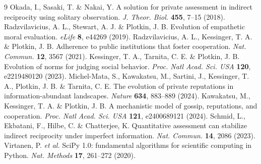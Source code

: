 \documentclass[fleqn,10pt]{article}
\theoremstyle{plain}
\theoremstyle{remark}
\begin{document}
\begin{thebibliography}{9}
Okada, I., Sasaki, T. \& Nakai, Y.
A solution for private assessment in indirect reciprocity using solitary observation.
\textit{J. Theor. Biol.} \textbf{455}, 7--15 (2018).
Radzvilavicius, A. L., Stewart, A. J. \& Plotkin, J. B.
Evolution of empathetic moral evaluation.
\textit{eLife} \textbf{8}, e44269 (2019).
Radzvilavicius, A. L., Kessinger, T. A. \& Plotkin, J. B.
Adherence to public institutions that foster cooperation.
\textit{Nat. Commun.} \textbf{12}, 3567 (2021).
Kessinger, T. A., Tarnita, C. E. \& Plotkin, J. B.
Evolution of norms for judging social behavior.
\textit{Proc. Natl Acad. Sci. USA} \textbf{120}, e2219480120 (2023).
Michel-Mata, S., Kawakatsu, M., Sartini, J., Kessinger, T. A., Plotkin, J. B. \& Tarnita, C. E.
The evolution of private reputations in information-abundant landscapes.
\textit{Nature} \textbf{634}, 883--889 (2024).
Kawakatsu, M., Kessinger, T. A. \& Plotkin, J. B.
A mechanistic model of gossip, reputations, and cooperation.
\textit{Proc. Natl Acad. Sci. USA} \textbf{121}, e2400689121 (2024).
Schmid, L., Ekbatani, F., Hilbe, C. \& Chatterjee, K.
Quantitative assessment can stabilize indirect reciprocity under imperfect information.
\textit{Nat. Commun.} \textbf{14}, 2086 (2023).
Virtanen, P. \textit{et al.}
SciPy 1.0: fundamental algorithms for scientific computing in Python.
\textit{Nat. Methods} \textbf{17}, 261--272 (2020).
\end{thebibliography}
\end{document}
